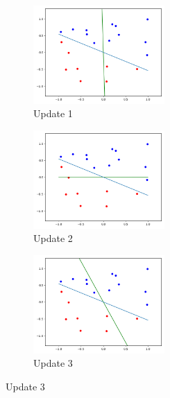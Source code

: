\documentclass[12pt,letterpaper]{article}
\begin{document}
\begin{enumerate}[leftmargin=!,labelindent=5pt]
        \begin{figure}[H]
        \begin{subfigure}{0.3\textwidth}
        \includegraphics[width=5cm]{images/b3.png} 
        \caption{Update 1}
        \label{fig:subim4}
        \end{subfigure}
        \begin{subfigure}{0.3\textwidth}
        \includegraphics[width=5cm]{images/b4.png}
        \caption{Update 2}
        \label{fig:subim5}
        \end{subfigure}
        \begin{subfigure}{0.3\textwidth}
        \includegraphics[width=5cm]{images/b5.png}
        \caption{Update 3}
        \label{fig:subim6}
        \end{subfigure}
        

\end{figure}
\end{enumerate}
\end{document}
